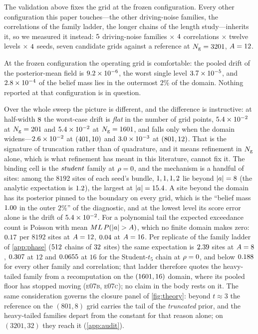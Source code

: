 The validation above fixes the grid at the frozen configuration. Every other
configuration this paper touches---the other driving-noise families, the correlations of
the family ladder, the longer chains of the length study---inherits it, so we measured
it instead: $5$ driving-noise families $\times$ $4$ correlations
$\times$ twelve levels $\times$ $4$ seeds, seven candidate grids against a
reference at $N_{\mathrm{g}}=3201$, $A=12$.

At the frozen configuration the operating grid is comfortable: the pooled drift of the
posterior-mean field is $9.2\times 10^{-6}$, the worst single level $3.7\times 10^{-5}$,
and $2.8\times 10^{-4}$ of the belief mass lies in the outermost $2\%$ of the domain.
Nothing reported at that configuration is in question.

Over the whole sweep the picture is different, and the difference is instructive: at
half-width $8$ the worst-case drift is \emph{flat} in the number of grid
points, $5.4\times 10^{-2}$ at $N_{\mathrm{g}}=201$ and $5.4\times 10^{-2}$ at
$N_{\mathrm{g}}=1601$, and falls only when the domain widens---$2.6\times 10^{-2}$ at
$(401,10)$ and $3.0\times 10^{-3}$ at $(801,12)$.
That is the signature of truncation rather than of quadrature, and it means refinement
in $N_{\mathrm{g}}$ alone, which is what refinement has meant in this literature, cannot fix it.
The binding cell is the $student$ family at $\rho=0$, and the
mechanism is a handful of sites: among the $8192$ sites of each seed's bundle,
$1, 1, 1, 2$ lie beyond $|a|=8$ (the analytic expectation is
$1.2$), the largest at $|a|=15.4$. A site beyond the domain has
its posterior pinned to the boundary on every grid, which is the ``belief mass
$1.00$ in the outer $2\%$'' of the diagnostic, and at the lowest level its
score error alone is the drift of $5.4\times 10^{-2}$. For a polynomial tail the
expected exceedance count is Poisson with mean $\nseq\nsites\,P(|a|>\halfwidth)$, which no
finite domain makes zero: $0.17$ per $8192$ sites at
$A=12$, $0.04$ at $A=16$. Per replicate of the
family ladder of \cref{app:phase} ($512$ chains of $32$ sites) the same
expectation is $2.39$ sites at $A=8$,
$0.307$ at $12$ and $0.0655$ at $16$ for the
Student-$t_5$ chain at $\rho=0$, and below $0.188$ for every other
family and correlation; that ladder therefore quotes the heavy-tailed family from a
recomputation on the $(1601,16)$ domain, where its pooled floor has
stopped moving (\textsc{e07b}, \textsc{e07c}); no claim in the body rests on it. The same
consideration governs the closure panel of \cref{fig:theory}: beyond $t\approx3$ the
reference on the $(801,8)$ grid carries the tail of the \emph{truncated} prior, and the
heavy-tailed families depart from the constant for that reason alone; on
$(3201,32)$ they reach it (\cref{app:audit}).

